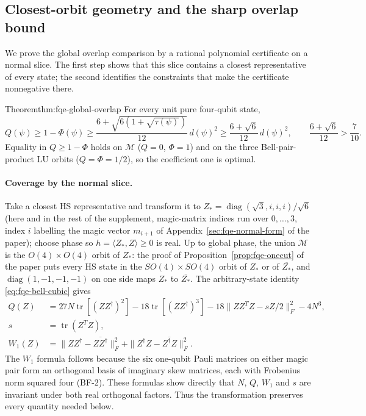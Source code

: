 \subsection{Closest-orbit geometry and the sharp overlap bound}
\label{sec:fqe-global-overlap}
We prove the global overlap comparison by a rational polynomial certificate on a normal slice.
The first step shows that this slice contains a closest representative of every state; the second identifies
the constraints that make the certificate nonnegative there.

\begin{restated}{Theorem}{thm:fqe-global-overlap}
For every unit pure four-qubit state,
\begin{equation*}
 Q(\psi)\ge1-\Phi(\psi)
 \ge\frac{6+\sqrt{6(1+\sqrt{\tau(\psi)})}}{12}\,d(\psi)^2
 \ge\frac{6+\sqrt6}{12}\,d(\psi)^2,\qquad \frac{6+\sqrt6}{12}>\frac7{10}.
\end{equation*}
Equality in $Q\ge1-\Phi$ holds on $\mathcal M$ ($Q=0$, $\Phi=1$) and on the three Bell-pair-product LU orbits
($Q=\Phi=1/2$), so the coefficient one is optimal.
\end{restated}

\paragraph{Coverage by the normal slice.}
Take a closest HS representative and transform it to
$Z_*=\operatorname{diag}(\sqrt3,i,i,i)/\sqrt6$ (here and in the rest of the supplement, magic-matrix indices run over $0,\dots,3$, index $i$ labelling the magic
vector $m_{i+1}$ of Appendix~\ref{sec:fqe-normal-form} of the paper); choose phase so
$h=\langle Z_*,Z\rangle\ge0$ is real. Up to global phase, the union
$\mathcal M$ is the $O(4)\times O(4)$ orbit of $Z_*$: the proof of Proposition~\ref{prop:fqe-onecut} of the paper
puts every HS state in the $SO(4)\times SO(4)$ orbit of $Z_*$ or of $\overline{Z_*}$, and $\operatorname{diag}(1,-1,-1,-1)$
on one side maps $Z_*$ to $\overline{Z_*}$.
The arbitrary-state identity \eqref{eq:fqe-bell-cubic} gives
\begin{equation}\label{eq:fqe-global-intrinsic}
 \begin{split}
 Q(Z)&=27N\operatorname{tr}[(ZZ^\dagger)^2]
      -18\operatorname{tr}[(ZZ^\dagger)^3]
      -18\|ZZ^TZ-sZ/2\|_F^2-4N^3,\\
 s&=\operatorname{tr}(Z^TZ),\\
 W_1(Z)&=\|ZZ^\dagger-\overline{ZZ^\dagger}\|_F^2
          +\|Z^\dagger Z-\overline{Z^\dagger Z}\|_F^2.
 \end{split}
\end{equation}
The $W_1$ formula follows because the six one-qubit Pauli matrices
on either magic pair form an orthogonal basis of imaginary skew matrices,
each with Frobenius norm squared four (BF-2).
These formulas show directly that $N$, $Q$, $W_1$ and $s$ are invariant under
both real orthogonal factors. Thus the transformation preserves every
quantity needed below.

